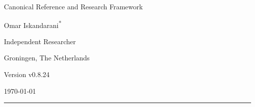 \documentclass[11pt]{article}
\theoremstyle{definition}
\theoremstyle{plain}
\theoremstyle{remark}
\begin{document}
    
    \thispagestyle{empty}

    \begin{center}
        \vspace*{0.06\textheight}

        {\LARGE\bfseries \papertitle\par}
        \vspace{0.45cm}

        {\large Canonical Reference and Research Framework\par}
        \vspace{1.0cm}

        {\Large Omar Iskandarani\textsuperscript{*}\par}
        \vspace{0.35cm}

        {\normalsize Independent Researcher\par}
        {\normalsize Groningen, The Netherlands\par}
        \vspace{0.6cm}

        {\normalsize Version v0.8.24\par}
        {\normalsize \today\par}
        \vspace{0.9cm}

        \rule{0.82\textwidth}{0.5pt}
        \vspace{0.7cm}
    \end{center}

    \begin{abstract}
        \noindent
        This document presents Swirl-String Theory (SST) as a structured canonical synthesis rather than as a claim that every phenomenological sector has already been derived to theorem level. The text records the impedance--resonance and free-to-bound-mode origin of the programme; consolidates the primitive constant chain linking the effective fluid density, characteristic swirl speed, Compton anchoring, and horn/circulation scale; assigns a minimal relational link-field action as the microscopic research candidate beneath the continuum torsion bridge; records the operational special-relativity postulate that stable vortex matter constructs local spacetime with clocks, rods, and luminal R-phase torsion pulses; and organizes delay selection, atomic bridges, spectroscopy, knot-geometry certification, relational time, and topology-based mass within one explicitly stratified framework. Throughout, historical provenance, calibrated identities, SST-internal derivations, predictions, and conjectural extensions are kept distinct so that the canon remains internally coherent, externally comparable, and open to falsification.
    \end{abstract}
\end{document}
